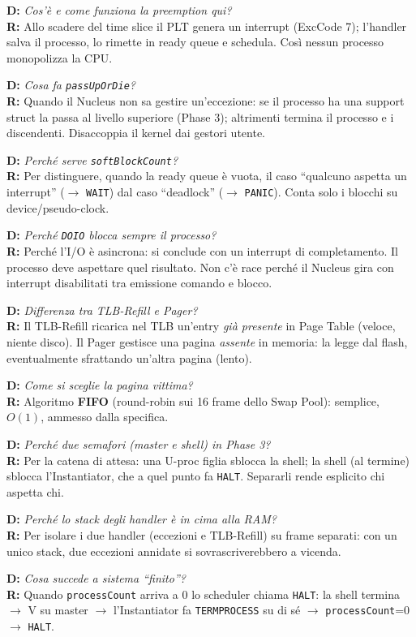 \documentclass[11pt,a4paper]{article}
\newcommand{\code}[1]{\texttt{#1}}
\newcommand{\qbox}[2]{%
  \par\smallskip\noindent
  \textbf{\color{kw}D:} \emph{#1}\\
  \textbf{R:} #2\par\smallskip
}
\begin{document}
\qbox{Cos'è e come funziona la preemption qui?}{Allo scadere del time slice il
PLT genera un interrupt (ExcCode 7); l'handler salva il processo, lo rimette in
ready queue e schedula. Così nessun processo monopolizza la CPU.}

\qbox{Cosa fa \code{passUpOrDie}?}{Quando il Nucleus non sa gestire
un'eccezione: se il processo ha una support struct la passa al livello
superiore (Phase 3); altrimenti termina il processo e i discendenti. Disaccoppia
il kernel dai gestori utente.}

\qbox{Perché serve \code{softBlockCount}?}{Per distinguere, quando la ready queue
è vuota, il caso ``qualcuno aspetta un interrupt'' ($\to$ \code{WAIT}) dal caso
``deadlock'' ($\to$ \code{PANIC}). Conta solo i blocchi su device/pseudo-clock.}

\qbox{Perché \code{DOIO} blocca sempre il processo?}{Perché l'I/O è asincrona:
si conclude con un interrupt di completamento. Il processo deve aspettare quel
risultato. Non c'è race perché il Nucleus gira con interrupt disabilitati tra
emissione comando e blocco.}

\qbox{Differenza tra TLB-Refill e Pager?}{Il TLB-Refill ricarica nel TLB
un'entry \emph{già presente} in Page Table (veloce, niente disco). Il Pager
gestisce una pagina \emph{assente} in memoria: la legge dal flash, eventualmente
sfrattando un'altra pagina (lento).}

\qbox{Come si sceglie la pagina vittima?}{Algoritmo \textbf{FIFO} (round-robin
sui 16 frame dello Swap Pool): semplice, $O(1)$, ammesso dalla specifica.}

\qbox{Perché due semafori (master e shell) in Phase 3?}{Per la catena di attesa:
una U-proc figlia sblocca la shell; la shell (al termine) sblocca
l'Instantiator, che a quel punto fa \code{HALT}. Separarli rende esplicito chi
aspetta chi.}

\qbox{Perché lo stack degli handler è in cima alla RAM?}{Per isolare i due
handler (eccezioni e TLB-Refill) su frame separati: con un unico stack, due
eccezioni annidate si sovrascriverebbero a vicenda.}

\qbox{Cosa succede a sistema ``finito''?}{Quando \code{processCount} arriva a 0
lo scheduler chiama \code{HALT}: la shell termina $\to$ V su master $\to$
l'Instantiator fa \code{TERMPROCESS} su di sé $\to$ \code{processCount}=0 $\to$
\code{HALT}.}
\end{document}
